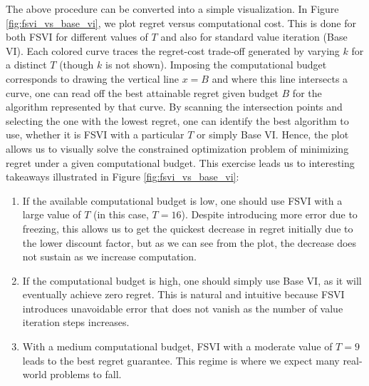 \documentclass[11pt, notitlepage]{article}
\newcommand{\1}{\mathbbm{1}}
\begin{document}
The above procedure can be converted into a simple visualization. In Figure \ref{fig:fsvi_vs_base_vi}, we plot regret versus computational cost. This is done for both FSVI for different values of $T$ and also for standard value iteration (Base VI).
Each colored curve traces the regret-cost trade‑off generated by varying $k$ for a distinct $T$ (though $k$ is not shown). Imposing the computational budget corresponds to drawing the vertical line $x=B$ and where this line intersects a curve, one can read off the best attainable regret given budget $B$ for the algorithm represented by that curve. By scanning the intersection points and selecting the one with the lowest regret, one can identify the best algorithm to use, whether it is FSVI with a particular $T$ or simply Base VI. Hence, the plot allows us to visually solve the constrained optimization problem of minimizing regret under a given computational budget. This exercise leads us to interesting takeaways illustrated in Figure \ref{fig:fsvi_vs_base_vi}:
\begin{enumerate}
    \item If the available computational budget is low, one should use FSVI with a large value of $T$ (in this case, $T=16$). Despite introducing more error due to freezing, this allows us to get the quickest decrease in regret initially due to the lower discount factor, but as we can see from the plot, the decrease does not sustain as we increase computation.
    \item If the computational budget is high, one should simply use Base VI, as it will eventually achieve zero regret. This is natural and intuitive because FSVI introduces unavoidable error that does not vanish as the number of value iteration steps increases.
    \item With a medium computational budget, FSVI with a moderate value of $T=9$ leads to the best regret guarantee. This regime is where we expect many real-world problems to fall.
\end{enumerate}
\end{document}
